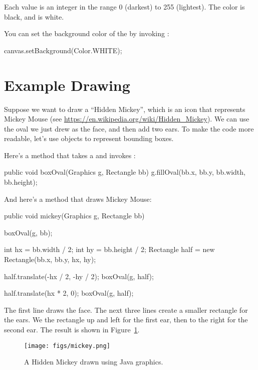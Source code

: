Each value is an integer in the range 0 (darkest) to 255 (lightest).
The color  is black, and  is white.

You can set the background color of the  by invoking :

\begin{code}
canvas.setBackground(Color.WHITE);
\end{code}


\section{Example Drawing}
\label{graphics_example-drawing}


Suppose we want to draw a ``Hidden Mickey'', which is an icon that represents Mickey Mouse (see \url{https://en.wikipedia.org/wiki/Hidden_Mickey}).
We can use the oval we just drew as the face, and then add two ears.
To make the code more readable, let's use  objects to represent bounding boxes.

Here's a method that takes a  and invokes :

\begin{code}
public void boxOval(Graphics g, Rectangle bb) {
    g.fillOval(bb.x, bb.y, bb.width, bb.height);
}
\end{code}

And here's a method that draws Mickey Mouse:

\begin{code}
public void mickey(Graphics g, Rectangle bb) {
    boxOval(g, bb);

    int hx = bb.width / 2;
    int hy = bb.height / 2;
    Rectangle half = new Rectangle(bb.x, bb.y, hx, hy);

    half.translate(-hx / 2, -hy / 2);
    boxOval(g, half);

    half.translate(hx * 2, 0);
    boxOval(g, half);
}
\end{code}

The first line draws the face.
The next three lines create a smaller rectangle for the ears.
We  the rectangle up and left for the first ear, then to the right for the second ear.
The result is shown in Figure~\ref{fig.mickey}.

\begin{figure}[!ht]
\begin{center}
\texttt{[image: figs/mickey.png]}
\caption{A Hidden Mickey drawn using Java graphics.}
\label{fig.mickey}
\end{center}
\end{figure}

